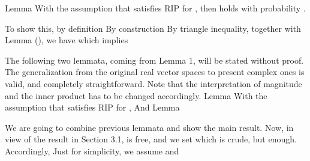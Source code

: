 \Result
{Lemma}
{
With the assumption that  satisfies RIP for , then
holds with probability .
}

To show this, by definition
By construction
By triangle inequality, together with Lemma (), we have
which implies
 

The following two lemmata, coming from  Lemma 1, will be stated without proof.
The generalization from the original real vector spaces to present complex ones is valid, and completely straightforward.
Note that the interpretation of magnitude and the inner product has to be changed accordingly.
\Result
{Lemma}
{
With the assumption that  satisfies RIP for ,
}
And
\Result
{Lemma}
{
}

\stopsubsection

\startsubsection [title={Main Result}]

We are going to combine previous lemmata and show the main result.
Now, in view of the result in Section 3.1,  is free, and we set
which is crude, but enough.
Accordingly,
Just for simplicity, we assume
and

